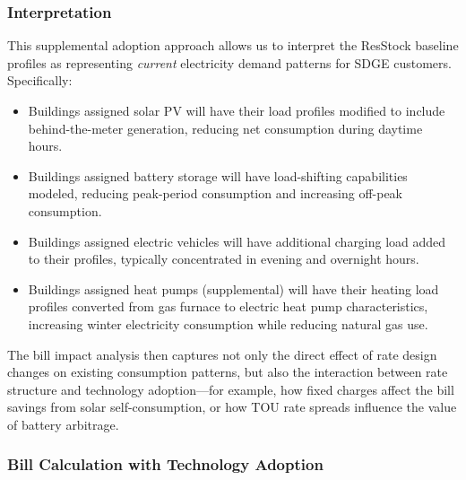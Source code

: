\subsubsection{Interpretation}
\label{sec:adoption_interpretation}

This supplemental adoption approach allows us to interpret the ResStock baseline profiles as representing \textit{current} electricity demand patterns for SDGE customers. Specifically:
\begin{itemize}
    \item Buildings assigned solar PV will have their load profiles modified to include behind-the-meter generation, reducing net consumption during daytime hours.
    \item Buildings assigned battery storage will have load-shifting capabilities modeled, reducing peak-period consumption and increasing off-peak consumption.
    \item Buildings assigned electric vehicles will have additional charging load added to their profiles, typically concentrated in evening and overnight hours.
    \item Buildings assigned heat pumps (supplemental) will have their heating load profiles converted from gas furnace to electric heat pump characteristics, increasing winter electricity consumption while reducing natural gas use.
\end{itemize}

The bill impact analysis then captures not only the direct effect of rate design changes on existing consumption patterns, but also the interaction between rate structure and technology adoption---for example, how fixed charges affect the bill savings from solar self-consumption, or how TOU rate spreads influence the value of battery arbitrage.


\subsubsection{Bill Calculation with Technology Adoption}
\label{sec:bill_calc_tech}

